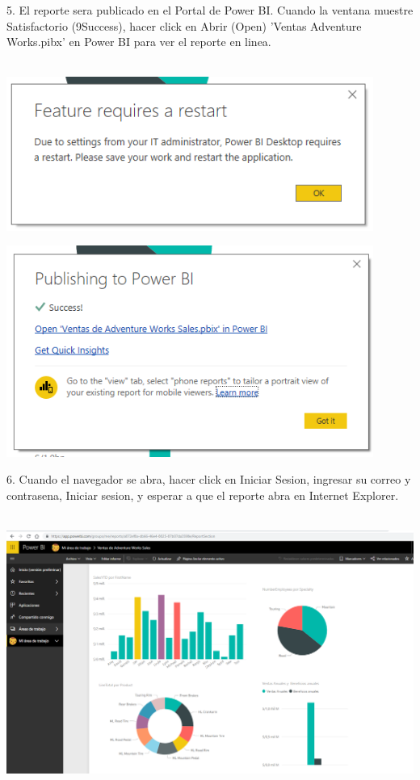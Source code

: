 \documentclass[12pt,letterpaper]{article}
\begin{document}
5. El reporte sera publicado en el Portal de Power BI. Cuando la ventana muestre Satisfactorio (9Success), hacer
click en Abrir (Open) 'Ventas Adventure Works.pibx' en Power BI para ver el reporte en linea.\\\\
\begin{center}
\includegraphics[width=12cm]{IMG/c.png} 
\end{center}
\begin{center}
\includegraphics[width=12cm]{IMG/d.png} 
\end{center}
6. Cuando el navegador se abra, hacer click en Iniciar Sesion, ingresar su correo y contrasena, Iniciar sesion, y
esperar a que el reporte abra en Internet Explorer.\\\\
\begin{center}
\includegraphics[width=18cm]{IMG/e.png} 
\end{center}
\end{document}
